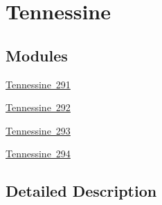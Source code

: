 \hypertarget{group___isotope_const-_tennessine}{}\section{Tennessine}
\label{group___isotope_const-_tennessine}
\subsection*{Modules}
\begin{DoxyCompactItemize}
\item 
\mbox{\hyperlink{group___isotope_const-_tennessine-_ts291}{Tennessine 291}}
\item 
\mbox{\hyperlink{group___isotope_const-_tennessine-_ts292}{Tennessine 292}}
\item 
\mbox{\hyperlink{group___isotope_const-_tennessine-_ts293}{Tennessine 293}}
\item 
\mbox{\hyperlink{group___isotope_const-_tennessine-_ts294}{Tennessine 294}}
\end{DoxyCompactItemize}


\subsection{Detailed Description}
